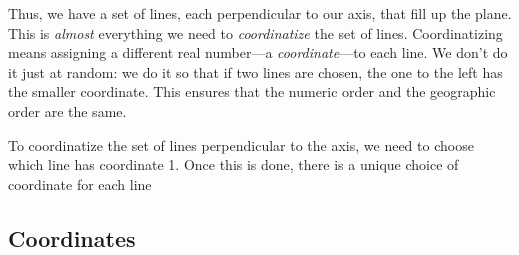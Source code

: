 \documentclass[12pt]{exam}
\theoremstyle{definition}
\begin{document}
Thus, we have a set of lines, each perpendicular to our axis, that fill
up the plane. This is \emph{almost} everything we need to
\emph{coordinatize} the set of lines. Coordinatizing means assigning a
different real number---a \emph{coordinate}---to each line. We don't do
it just at random: we do it so that if two lines are chosen, the one to
the left has the smaller coordinate. This ensures that the numeric order
and the geographic order are the same.

To coordinatize the set of lines perpendicular to the axis, we need to
choose which line has coordinate 1. Once this is done, there is a unique
choice of coordinate for each line

\subsection{Coordinates} 
\end{document}
